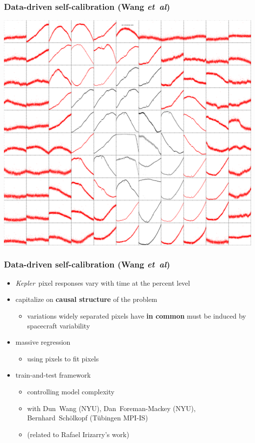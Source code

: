 \documentclass[aspectratio=169]{beamer}
\newcommand{\foreign}[1]{\textsl{#1}}
\newcommand{\etal}{\foreign{et~al}}
\renewcommand{\emph}[1]{\textbf{#1}}
\newcommand{\project}[1]{\textsl{#1}}
\newcommand{\Kepler}{\project{Kepler}}
\begin{document}
\begin{frame}
  \frametitle{Data-driven self-calibration \small{(Wang \etal)}}
  \includegraphics[height=0.85\textheight]{kic_03544595_05_pixels.png}
\end{frame}

\begin{frame}
  \frametitle{Data-driven self-calibration \small{(Wang \etal)}}
  \begin{itemize}
  \item \Kepler\ pixel responses vary with time at the percent level
  \item capitalize on \emph{causal structure} of the problem
    \begin{itemize}
    \item variations widely separated pixels have \emph{in common} must be induced by spacecraft variability
    \end{itemize}
  \item massive regression
    \begin{itemize}
    \item using pixels to fit pixels
    \end{itemize}
  \item train-and-test framework
    \begin{itemize}
    \item controlling model complexity
    \item with Dun~Wang (NYU), Dan~Foreman-Mackey (NYU), Bernhard~Sch\"olkopf (T\"ubingen MPI-IS)
    \item (related to Rafael Irizarry's work)
    \end{itemize}
  \end{itemize}
\end{frame}
\end{document}

